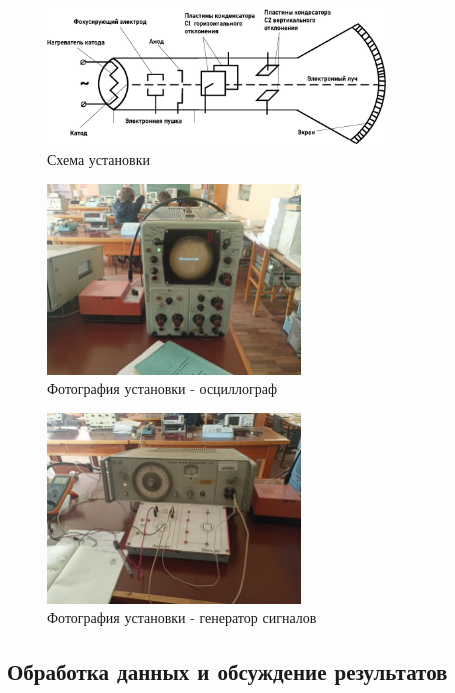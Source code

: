 \begin{figure}[ht!]
\centering
\includegraphics[width=0.8\textwidth]{схема_3.eps}
\caption{Схема установки}
\label{fig:sketch}
\end{figure}

\begin{figure}[H]
\centering
\includegraphics[width=0.6\textwidth]{1.jpg}
\caption{Фотография установки - осциллограф}
\label{fig:device}
\end{figure}

\begin{figure}[H]
\centering
\includegraphics[width=0.6\textwidth]{2.jpg}
\caption{Фотография установки - генератор сигналов}
\label{fig:device}
\end{figure}


\subsection{Обработка данных и обсуждение результатов}

